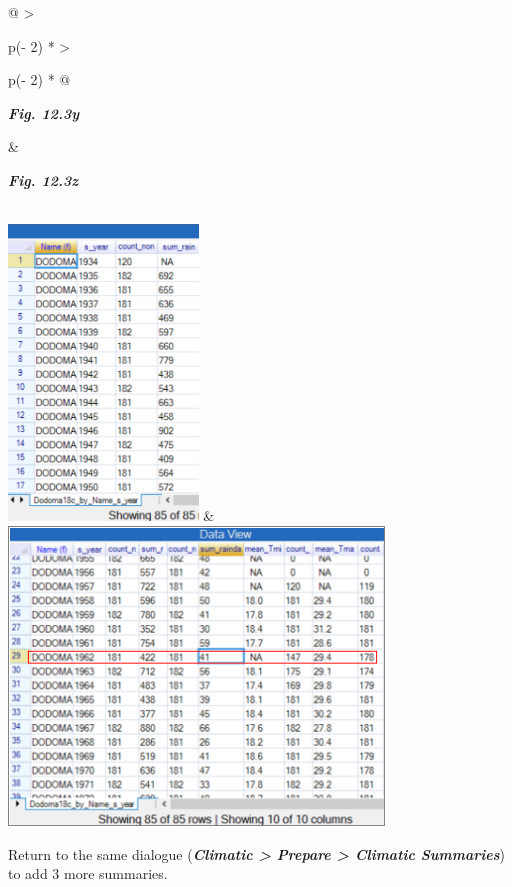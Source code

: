 \documentclass[
  letterpaper,
  DIV=11,
  numbers=noendperiod]{scrreprt}
\begin{document}
\begin{longtable}[]{@{}
  >{\raggedright\arraybackslash}p{(\columnwidth - 2\tabcolsep) * }
  >{\raggedright\arraybackslash}p{(\columnwidth - 2\tabcolsep) * }@{}}
\toprule\noalign{}
\begin{minipage}[b]{\linewidth}\raggedright
\textbf{\emph{Fig. 12.3y}}
\end{minipage} & \begin{minipage}[b]{\linewidth}\raggedright
\textbf{\emph{Fig. 12.3z}}
\end{minipage} \\
\midrule\noalign{}
\endhead
\bottomrule\noalign{}
\endlastfoot
\includegraphics[width=1.98446in,height=3.094in]{figures/Fig12.3y.png} &
\includegraphics[width=3.93056in,height=3.12658in]{figures/Fig12.3z.png} \\
\end{longtable}

Return to the same dialogue (\textbf{\emph{Climatic \textgreater{}
Prepare \textgreater{} Climatic Summaries}}) to add 3 more summaries.
\end{document}

